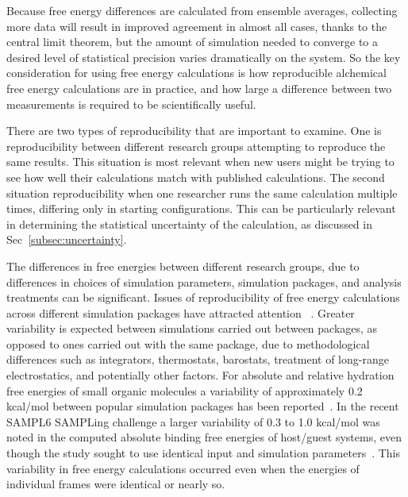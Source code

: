\documentclass[9pt,bestpractices]{livecoms}
\begin{document}
Because free energy differences are calculated from ensemble averages, collecting more data will result in improved agreement in almost all cases, thanks to the central limit theorem, but the amount of simulation needed to converge to a desired level of statistical precision varies dramatically on the system. So the key consideration for using free energy calculations is how reproducible alchemical free energy calculations are in practice, and how large a difference between two measurements is required to be scientifically useful.


There are two types of reproducibility that are important to examine.  One is reproducibility between different research groups attempting to reproduce the same results. This situation is most relevant when new users might be trying to see how well their calculations match with published calculations. The second situation reproducibility when one researcher runs the same calculation multiple times, differing only in starting configurations. This can be particularly relevant in determining the statistical uncertainty of the calculation, as discussed in Sec~\ref{subsec:uncertainty}.


The differences in free energies between different research groups, due to differences in choices of simulation parameters, simulation packages, and analysis treatments can be significant. Issues of reproducibility of free energy calculations across different simulation packages have attracted attention ~\cite{loeffler2018reproducibility,rizzi2019sampl6, wade2022, herz2025modular, bhati2022, bhati2025}. Greater variability is expected between simulations carried out between packages, as opposed to ones carried out with the same package, due to methodological differences such as integrators, thermostats, barostats, treatment of long-range electrostatics, and potentially other factors. For absolute and relative hydration free energies of small organic molecules a variability of approximately 0.2 kcal/mol between popular simulation packages has been reported~\cite{loeffler2018reproducibility}. In the recent SAMPL6 SAMPLing challenge a larger variability of 0.3 to 1.0 kcal/mol was noted in the computed absolute binding free energies of host/guest systems, even though the study sought to use identical input and simulation parameters~\cite{rizzi2019sampl6}. This variability in free energy calculations occurred even when the energies of individual frames were identical or nearly so.
\end{document}
